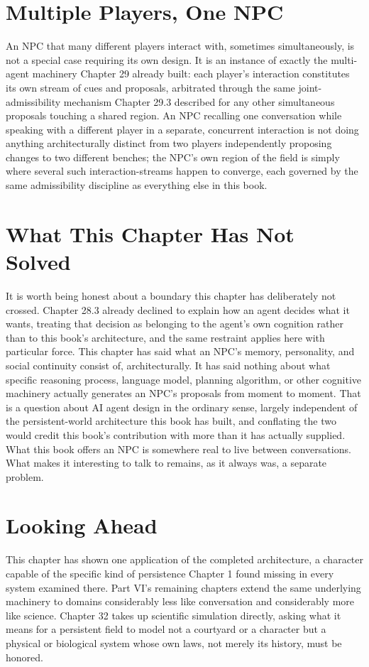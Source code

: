 \section{Multiple Players, One NPC}

An NPC that many different players interact with, sometimes simultaneously, is not a special case requiring its own design. It is an instance of exactly the multi-agent machinery Chapter 29 already built: each player's interaction constitutes its own stream of cues and proposals, arbitrated through the same joint-admissibility mechanism Chapter 29.3 described for any other simultaneous proposals touching a shared region. An NPC recalling one conversation while speaking with a different player in a separate, concurrent interaction is not doing anything architecturally distinct from two players independently proposing changes to two different benches; the NPC's own region of the field is simply where several such interaction-streams happen to converge, each governed by the same admissibility discipline as everything else in this book.

\section{What This Chapter Has Not Solved}

It is worth being honest about a boundary this chapter has deliberately not crossed. Chapter 28.3 already declined to explain how an agent decides what it wants, treating that decision as belonging to the agent's own cognition rather than to this book's architecture, and the same restraint applies here with particular force. This chapter has said what an NPC's memory, personality, and social continuity consist of, architecturally. It has said nothing about what specific reasoning process, language model, planning algorithm, or other cognitive machinery actually generates an NPC's proposals from moment to moment. That is a question about AI agent design in the ordinary sense, largely independent of the persistent-world architecture this book has built, and conflating the two would credit this book's contribution with more than it has actually supplied. What this book offers an NPC is somewhere real to live between conversations. What makes it interesting to talk to remains, as it always was, a separate problem.

\section{Looking Ahead}

This chapter has shown one application of the completed architecture, a character capable of the specific kind of persistence Chapter 1 found missing in every system examined there. Part VI's remaining chapters extend the same underlying machinery to domains considerably less like conversation and considerably more like science. Chapter 32 takes up scientific simulation directly, asking what it means for a persistent field to model not a courtyard or a character but a physical or biological system whose own laws, not merely its history, must be honored.
